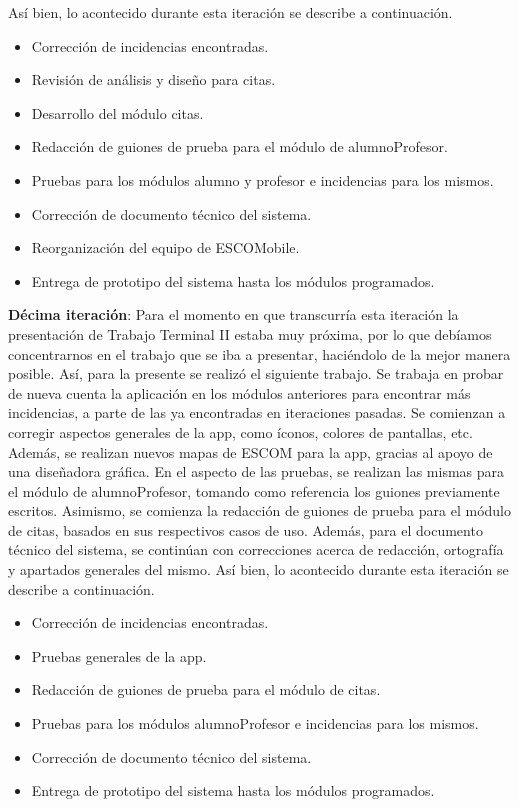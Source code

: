 \newline
Así bien, lo acontecido durante esta iteración se describe a continuación. 
\begin{itemize}
	\item Corrección de incidencias encontradas.
	\item Revisión de análisis y diseño para citas.
	\item Desarrollo del módulo citas.
	\item Redacción de guiones de prueba para el módulo de alumnoProfesor.
	\item Pruebas para los módulos alumno y profesor e incidencias para los mismos.
	\item Corrección de documento técnico del sistema.
	\item Reorganización del equipo de ESCOMobile.
	\item Entrega de prototipo del sistema hasta los módulos programados.
\end{itemize}

\noindent
\newline
\textbf{Décima iteración}: Para el momento en que transcurría esta iteración la presentación de Trabajo Terminal II estaba muy próxima, por lo que debíamos concentrarnos en el trabajo que se iba a presentar, haciéndolo de la mejor manera posible. Así, para la presente se realizó el siguiente trabajo. 
\newline
\newline
Se trabaja en probar de nueva cuenta la aplicación en los módulos anteriores para encontrar más incidencias, a parte de las ya encontradas en iteraciones pasadas. Se comienzan a corregir aspectos generales de la app, como íconos, colores de pantallas, etc. Además, se realizan nuevos mapas de ESCOM para la app, gracias al apoyo de una diseñadora gráfica.
\newline
En el aspecto de las pruebas, se realizan las mismas para el módulo de alumnoProfesor, tomando como referencia los guiones previamente escritos. Asimismo, se comienza la redacción de guiones de prueba para el módulo de citas, basados en sus respectivos casos de uso. 
\newline
Además, para el documento técnico del sistema, se continúan con correcciones acerca de redacción, ortografía y apartados generales del mismo.
\newline
Así bien, lo acontecido durante esta iteración se describe a continuación. 
\begin{itemize}
	\item Corrección de incidencias encontradas.
	\item Pruebas generales de la app. 
	\item Redacción de guiones de prueba para el módulo de citas.
	\item Pruebas para los módulos alumnoProfesor e incidencias para los mismos.
	\item Corrección de documento técnico del sistema.
	\item Entrega de prototipo del sistema hasta los módulos programados.
\end{itemize}